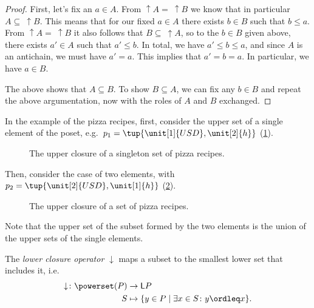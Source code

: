 \begin{proof}
First, let's fix an $a \in A$. From $\uparrow A = \ \uparrow B$ we know that in particular $A \subseteq \ \uparrow B$. This means that for our fixed $a \in A$ there exists $b \in B$ such that $b \leq a$. From $\uparrow A = \ \uparrow B$ it also follows that $B \subseteq \ \uparrow A$, so to the  $b \in B$ given above, there exists $a' \in A$ such that $a' \leq b$. In total, we have $a' \leq b \leq a$, and since $A$ is an antichain, we must have $a' = a$. This implies that $a' = b = a$. In particular, we have $a \in B$. 

The above shows that $A \subseteq B$. To show $B \subseteq A$, we can fix any $b \in B$ and repeat the above argumentation, now with the roles of $A$ and $B$ exchanged.  
\end{proof}

In the example of the pizza recipes, first, consider the upper set of a single element of the poset, e.g.~$p_1=\tup{\unit[1]{USD},\unit[2]{h}}$  (\cref{fig:upperclosure_1}).
\begin{figure}[h!]
\begin{center}
\end{center}
\caption{The upper closure of a singleton set of pizza recipes. \label{fig:upperclosure_1}}
\end{figure}
Then, consider the case of two elements, with~$p_2=\tup{\unit[2]{USD},\unit[1]{h}}$ (\cref{fig:upperclosure_2}).

\begin{figure}[h!]
\begin{center}
\end{center}
\caption{The upper closure of a set of pizza recipes. \label{fig:upperclosure_2}}
\end{figure}
Note that the upper set of the subset formed by the two elements is the union of the upper sets of the single elements.

\begin{definition}
The \emph{lower closure operator} $\downarrow$ maps a subset to the smallest lower set that includes it, i.e.
\begin{equation}
    \begin{aligned}
    \downarrow\colon \powerset(P)&\to \mathsf{L}P\\
    S&\mapsto \{ y\in P \mid \exists x\in S \colon y\ordleq x\}.
    \end{aligned}
\end{equation}
\end{definition}

